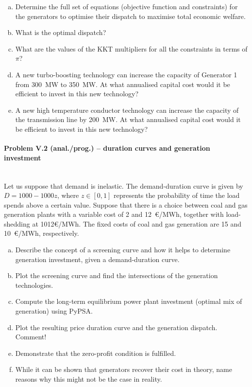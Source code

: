 \documentclass[11pt,a4paper,fleqn]{scrartcl}
\begin{document}
\begin{enumerate}[(a)]
 \item Determine the full set of equations (objective function and
       constraints) for the generators to optimise their dispatch to
       maximise total economic welfare.
 \item What is the optimal dispatch?
 \item What are the values of the KKT multipliers for all the constraints in terms of $\pi$?
 \item A new turbo-boosting technology can increase the capacity of Generator 1 from 300~MW to 350~MW.  At what annualised capital cost would it be efficient to invest in this new technology?
 \item A new high temperature conductor technology can increase the capacity of the transmission line by 200~MW. At what annualised capital cost would it be efficient to invest in this new technology?
\end{enumerate}

\newpage
\paragraph{Problem V.2 (anal./prog.) -- duration curves and generation investment \faGroup}~\\

Let us suppose that demand is inelastic. The demand-duration curve is given by $D=1000-1000z$, where $z\in [0,1]$ represents the probability of time the load spends above a certain value. Suppose that there is a choice between coal and gas generation plants with a variable cost of 2 and 12~\euro/MWh, together with load-shedding at 1012\euro/MWh. The fixed costs of coal and gas generation are 15 and 10~\euro/MWh, respectively.

\begin{enumerate}[(a)]
 \item Describe the concept of a screening curve and how it helps to determine generation investment, given a demand-duration curve.
 \item Plot the screening curve and find the intersections of the generation technologies.
 \item Compute the long-term equilibrium power plant investment (optimal mix of generation) using PyPSA.
 \item Plot the resulting price duration curve and the generation dispatch. Comment!
 \item Demonstrate that the zero-profit condition is fulfilled.
 \item While it can be shown that generators recover their cost in theory, name reasons why this might not be the case in reality.
\end{enumerate}
\end{document}
